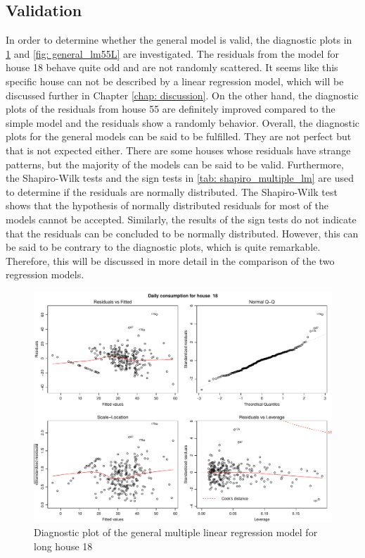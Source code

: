 \subsection{Validation}
In order to determine whether the general model is valid, the diagnostic plots in \cref{fig: general_lm18L} and \cref{fig: general_lm55L} are investigated. The residuals from the model for house 18 behave quite odd and are not randomly scattered. It seems like this specific house can not be described by a linear regression model, which will be discussed further in Chapter \ref{chap: discussion}. On the other hand, the diagnostic plots of the residuals from house 55 are definitely improved compared to the simple model and the residuals show a randomly behavior. Overall, the diagnostic plots for the general models can be said to be fulfilled. They are not perfect but that is not expected either. There are some houses whose residuals have strange patterns, but the majority of the models can be said to be valid. Furthermore, the Shapiro-Wilk tests and the sign tests in \cref{tab: shapiro_multiple_lm} are used to determine if the residuals are normally distributed. The Shapiro-Wilk test shows that the hypothesis of normally distributed residuals for most of the models cannot be accepted. Similarly, the results of the sign tests do not indicate that the residuals can be concluded to be normally distributed. However, this can be said to be contrary to the diagnostic plots, which is quite remarkable. Therefore, this will be discussed in more detail in the comparison of the two regression models.
\begin{figure}
    \centering
    \includegraphics[width=1.\textwidth]{../../../figures/general_lm18L.pdf}
    \caption{Diagnostic plot of the general multiple linear regression model for long house 18}
    \label{fig: general_lm18L}
\end{figure}
